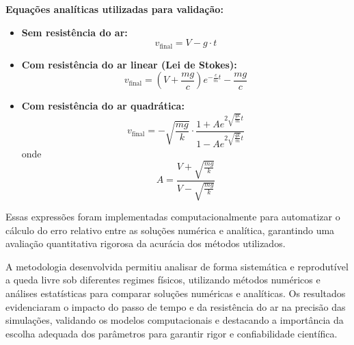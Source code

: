 \textbf{Equações analíticas utilizadas para validação:}
\begin{itemize}
    \item \textbf{Sem resistência do ar:}
    \begin{equation}
        v_{\text{final}} = V - g \cdot t
    \end{equation}
    \item \textbf{Com resistência do ar linear (Lei de Stokes):}
    \begin{equation}
        v_{\text{final}} = \left(V + \frac{mg}{c}\right) e^{-\frac{c}{m} t} - \frac{mg}{c}
    \end{equation}
    \item \textbf{Com resistência do ar quadrática:}
    \begin{equation}
        v_{\text{final}} = -\sqrt{\frac{mg}{k}} \cdot \frac{1 + A e^{2 \sqrt{\frac{gk}{m}} t}}{1 - A e^{2 \sqrt{\frac{gk}{m}} t}}
    \end{equation}
    onde
    \begin{equation}
        A = \frac{V + \sqrt{\frac{mg}{k}}}{V - \sqrt{\frac{mg}{k}}}
    \end{equation}
\end{itemize}
Essas expressões foram implementadas computacionalmente para automatizar o cálculo do erro relativo entre as soluções numérica e analítica, garantindo uma avaliação quantitativa rigorosa da acurácia dos métodos utilizados.

A metodologia desenvolvida permitiu analisar de forma sistemática e reprodutível a queda livre sob diferentes regimes físicos, utilizando métodos numéricos e análises estatísticas para comparar soluções numéricas e analíticas. Os resultados evidenciaram o impacto do passo de tempo e da resistência do ar na precisão das simulações, validando os modelos computacionais e destacando a importância da escolha adequada dos parâmetros para garantir rigor e confiabilidade científica.